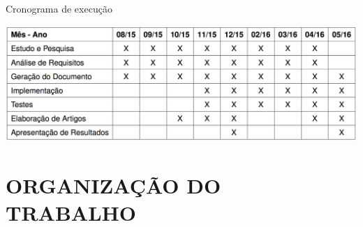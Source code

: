 \renewcommand{\arraystretch}{1.5}


\begin{table}[h!]
	\centering
	\caption{Cronograma de execução}
	\includegraphics[width=1\textwidth]{Cap1/imagens/tabela}
	\label{cronograma}
\end{table}


\section{ORGANIZAÇÃO DO TRABALHO}\label{sec:organizacao-trabalho}

